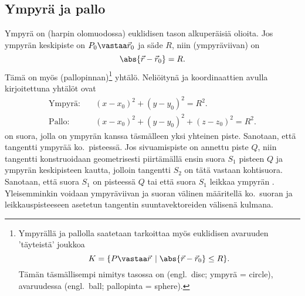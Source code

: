 \subsection*{Ympyrä ja pallo}
 

Ympyrä on (harpin olomuodossa) euklidisen tason alkuperäisiä olioita. Jos ympyrän keskipiste
on $P_0\vastaa\vec r_0$ ja säde $R$, niin  (ympyräviivan)  on
\[
\abs{\vec r-\vec r_0} = R.
\]
Tämä on myös  (pallopinnan)\footnote[2]{Ympyrällä ja pallolla saatetaan tarkoittaa 
myös euklidisen avaruuden 'täyteistä' joukkoa
\[
K = \{P\vastaa\vec r\, \mid \abs{\vec r-\vec r_0} \le R\}.
\]
Tämän täsmällisempi nimitys tasossa on  (engl.\ disc; ympyrä = circle), avaruudessa
 (engl.\ ball; pallopinta = sphere).  } yhtälö.
Neliöitynä ja koordinaattien avulla kirjoitettuna yhtälöt ovat
\begin{align*}
\text{Ympyrä:} \quad &(x-x_0)^2+(y-y_0)^2=R^2. \\
\text{Pallo:}  \quad &(x-x_0)^2+(y-y_0)^2+(z-z_0)^2=R^2.
\end{align*}
%
 on suora, jolla on ympyrän kanssa täsmälleen yksi yhteinen piste. 
Sanotaan, että tangentti  ympyrää ko.\ pisteessä. Jos sivuamispiste on annettu
piste $Q$, niin tangentti konstruoidaan geometrisesti piirtämällä ensin suora $S_1$ pisteen
$Q$ ja ympyrän keskipisteen kautta, jolloin tangentti $S_2$ on tätä vastaan kohtisuora. 
Sanotaan, että suora $S_1$ on
%
 pisteessä $Q$ tai että suora $S_1$
leikkaa ympyrän . Yleisemminkin voidaan ympyräviivan ja suoran välinen 
%
 määritellä ko.\ suoran ja leikkauspisteeseen asetetun tangentin
suuntavektoreiden välisenä kulmana.

